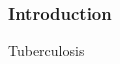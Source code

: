 \documentclass[11pt, a4paper]{article}
\begin{document}


\subsubsection*{Introduction} 
Tuberculosis 
\end{document}
